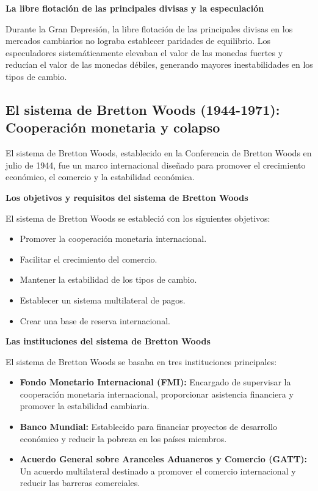 \documentclass[
  jou,
  floatsintext,
  longtable,
  a4paper,
  nolmodern,
  notxfonts,
  notimes,
  12pt,
  colorlinks=true,linkcolor=blue,citecolor=blue,urlcolor=blue]{apa7}
\providecommand{\tightlist}{%
  \setlength{\itemsep}{0pt}\setlength{\parskip}{0pt}}
\begin{document}
\textbf{La libre flotación de las principales divisas y la especulación}

Durante la Gran Depresión, la libre flotación de las principales divisas
en los mercados cambiarios no lograba establecer paridades de
equilibrio. Los especuladores sistemáticamente elevaban el valor de las
monedas fuertes y reducían el valor de las monedas débiles, generando
mayores inestabilidades en los tipos de cambio.

\subsection{El sistema de Bretton Woods (1944-1971): Cooperación
monetaria y
colapso}\label{el-sistema-de-bretton-woods-1944-1971-cooperaciuxf3n-monetaria-y-colapso}

El sistema de Bretton Woods, establecido en la Conferencia de Bretton
Woods en julio de 1944, fue un marco internacional diseñado para
promover el crecimiento económico, el comercio y la estabilidad
económica.

\textbf{Los objetivos y requisitos del sistema de Bretton Woods}

El sistema de Bretton Woods se estableció con los siguientes objetivos:

\begin{itemize}
\tightlist
\item
  Promover la cooperación monetaria internacional.
\item
  Facilitar el crecimiento del comercio.
\item
  Mantener la estabilidad de los tipos de cambio.
\item
  Establecer un sistema multilateral de pagos.
\item
  Crear una base de reserva internacional.
\end{itemize}

\textbf{Las instituciones del sistema de Bretton Woods}

El sistema de Bretton Woods se basaba en tres instituciones principales:

\begin{itemize}
\tightlist
\item
  \textbf{Fondo Monetario Internacional (FMI):} Encargado de supervisar
  la cooperación monetaria internacional, proporcionar asistencia
  financiera y promover la estabilidad cambiaria.
\item
  \textbf{Banco Mundial:} Establecido para financiar proyectos de
  desarrollo económico y reducir la pobreza en los países miembros.
\item
  \textbf{Acuerdo General sobre Aranceles Aduaneros y Comercio (GATT):}
  Un acuerdo multilateral destinado a promover el comercio internacional
  y reducir las barreras comerciales.
\end{itemize}
\end{document}

